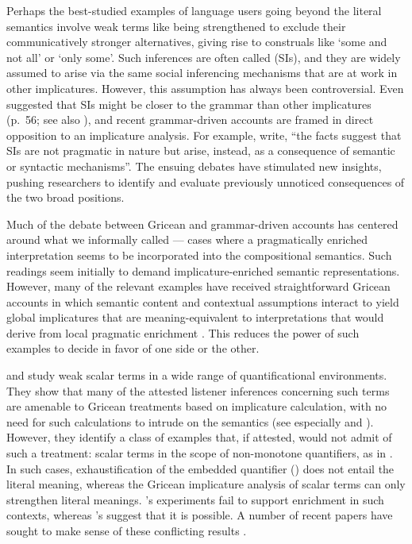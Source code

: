 \documentclass[leqno,12pt]{article}
\begin{document}
Perhaps the best-studied examples of language users going beyond the
literal semantics involve weak terms like  being
strengthened to exclude their communicatively stronger alternatives,
giving rise to construals like `some and not all' or `only some'.
Such inferences are often called  (SIs), and they are widely assumed to arise via the
same social inferencing mechanisms that are at work in other
implicatures.  However, this assumption has always been
controversial. Even \citeauthor{Grice75} suggested that SIs might be
closer to the grammar than other implicatures (p.~56; see also
\citealt{Levinson00,Sperber95,Bach06}), and recent grammar-driven
accounts are framed in direct opposition to an implicature analysis.
For example,  write, ``the facts
suggest that SIs are not pragmatic in nature but arise, instead, as a
consequence of semantic or syntactic mechanisms''. The ensuing debates
have stimulated new insights, pushing researchers to identify and
evaluate previously unnoticed consequences of the two broad positions.

Much of the debate between Gricean and grammar-driven accounts has
centered around what we informally called 
--- cases where a pragmatically enriched interpretation seems to be
incorporated into the compositional semantics. Such readings seem
initially to demand implicature-enriched semantic representations.
However, many of the relevant examples have received straightforward
Gricean accounts in which semantic content and contextual assumptions
interact to yield global implicatures that are meaning-equivalent to
interpretations that would derive from local pragmatic enrichment
\citep{Russell06,Geurts09,Geurts:2011}. This reduces the power of such
examples to decide in favor of one side or the other.

\citet{Geurts:Pouscoulous:2009} and \citet{Chemla:Spector:2011} study
weak scalar terms in a wide range of quantificational environments.
They show that many of the attested listener inferences concerning
such terms are amenable to Gricean treatments based on implicature
calculation, with no need for such calculations to intrude on the
semantics (see especially  and
).  However, they identify a class
of examples that, if attested, would not admit of such a treatment:
scalar terms in the scope of non-monotone quantifiers, as in
. In such cases,
exhaustification of the embedded quantifier () does not entail the literal meaning, whereas the
Gricean implicature analysis of scalar terms can only strengthen
literal meanings. \citeauthor{Geurts:Pouscoulous:2009}'s experiments
fail to support enrichment in such contexts, whereas
\citeauthor{Chemla:Spector:2011}'s suggest that it is possible. A
number of recent papers have sought to make sense of these conflicting
results
\citep{Clifton:Dube:2010,geurts-vantiel:2013:scalar,vanTiel:2014}.
\end{document}
